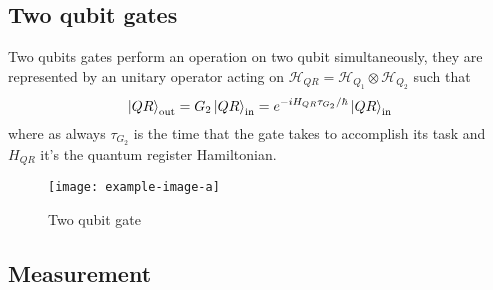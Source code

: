 \subsection{Two qubit gates}
Two qubits gates perform an operation on two qubit simultaneously, they are represented by an unitary operator acting on $\mathcal{H}_{QR} = \mathcal{H}_{Q_1} \otimes \mathcal{H}_{Q_2}$ such that
\begin{equation*}
   \ket{QR}_\textup{out} = G_2\ket{QR}_\textup{in} = e^{-iH_{QR} \tau_{G_2}/\hbar}\ket{QR}_\textup{in}
\end{equation*}
where as always $\tau_{G_2}$ is the time that the gate takes to accomplish its task and $H_{QR}$ it's the quantum register Hamiltonian.

\begin{figure}
\centering
\texttt{[image: example-image-a]}
\caption{Two qubit gate}
\label{fig:two-qubit-gate}
\end{figure}


\subsection{Measurement}\label{sec:measurement}